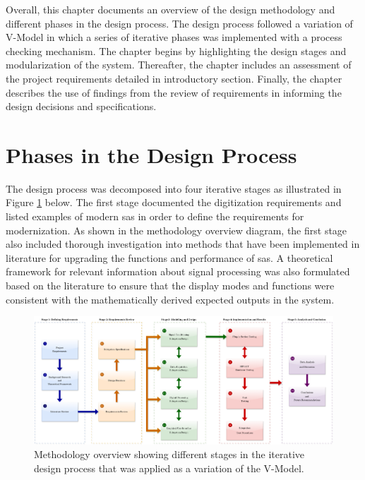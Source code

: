 \documentclass[class=report,11pt,crop=false]{standalone}
\begin{document}
	Overall, this chapter documents an overview of the design methodology and different phases in the design process. The design process followed a variation of V-Model in which a series of iterative phases was implemented with a process checking mechanism. The chapter begins by highlighting the design stages and modularization of the system. Thereafter, the chapter includes an assessment of the project requirements detailed in introductory section. Finally, the chapter describes the use of findings from the review of requirements in informing the design decisions and specifications.  
	
	\section{Phases in the Design Process}
	
	The design process was decomposed into four iterative stages as illustrated in Figure \ref{fig:design-stages-diagram} below. The first stage documented the digitization requirements and listed examples of modern \acrshort{sa}s in order to define the requirements for modernization. As shown in the methodology overview diagram, the first stage also included thorough investigation into methods that have been implemented in literature for upgrading the functions and performance of \acrshort{sa}s. A theoretical framework for relevant information about signal processing was also formulated based on the literature to ensure that the display modes and functions were consistent with the mathematically derived expected outputs in the system. 
	
	\begin{figure}[!ht]
		\centering
		\label{fig:design-stages-diagram}
		\includegraphics[width=1.0\linewidth]{Figures/Methodology/design-stages-diagram.png}
		\caption{Methodology overview showing different stages in the iterative design process that was applied as a variation of the V-Model.}
	\end{figure}
	
\end{document}
